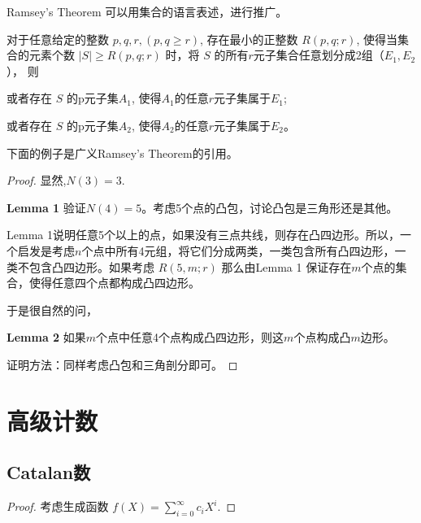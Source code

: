 \documentclass[oneside]{book}
\begin{document}
Ramsey's Theorem 可以用集合的语言表述，进行推广。
 {
    对于任意给定的整数 $p,q,r,(p,q \ge r)$, 存在最小的正整数 $R(p,q;r)$, 使得当集合的元素个数 $|S| \ge R(p,q;r)$ 时，将 $S$ 的所有$r$元子集合任意划分成2组（$E_1,E_2$）， 
    则 

    或者存在 $S$ 的p元子集$A_1$, 使得$A_1$的任意$r$元子集属于$E_1$;

    或者存在 $S$ 的p元子集$A_2$, 使得$A_2$的任意$r$元子集属于$E_2$。
}

下面的例子是广义Ramsey's Theorem的引用。


\begin{proof}
    显然,$N(3) = 3$. 

    {\bf Lemma 1} 验证$N(4) = 5$。考虑5个点的凸包，讨论凸包是三角形还是其他。
    
    Lemma 1说明任意5个以上的点，如果没有三点共线，则存在凸四边形。所以，一个启发是考虑$n$个点中所有4元组，将它们分成两类，一类包含所有凸四边形，一类不包含凸四边形。如果考虑 $R(5,m;r)$ 那么由Lemma 1
    保证存在$m$个点的集合，使得任意四个点都构成凸四边形。
    
    于是很自然的问，

    {\bf Lemma 2} 如果$m$个点中任意4个点构成凸四边形，则这$m$个点构成凸$m$边形。
    
    证明方法：同样考虑凸包和三角剖分即可。

\end{proof}

\chapter{高级计数}

\section{Catalan数}


\begin{proof}
    考虑生成函数 $f(X) = \sum_{i = 0}^{\infty} c_i X^i$. 


\end{proof}
\end{document}

